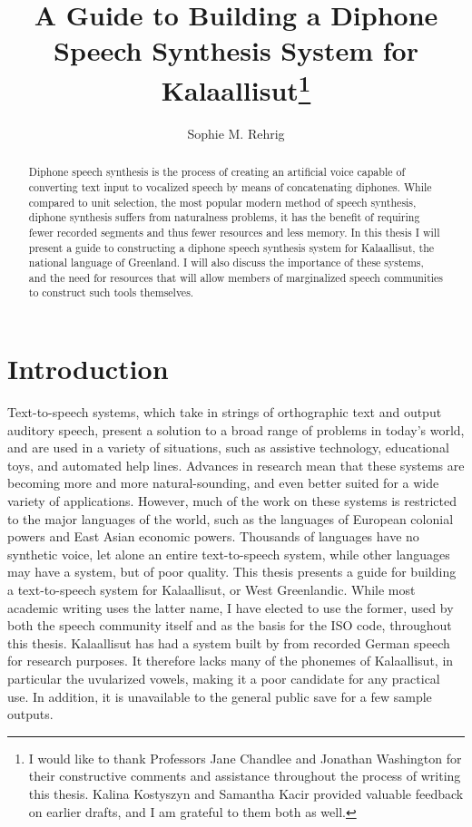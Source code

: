 \documentclass[12pt]{article}
\title{\vspace{-2cm}A Guide to Building a Diphone Speech Synthesis System for Kalaallisut\thanks{I would like to thank Professors Jane Chandlee and Jonathan Washington for their constructive comments and assistance throughout the process of writing this thesis. Kalina Kostyszyn and Samantha Kacir provided valuable feedback on earlier drafts, and I am grateful to them both as well.}}
\author{Sophie M. Rehrig}
\date{{\small\parbox{\linewidth}{\centering
A thesis submitted in partial fulfillment of the requirements for the degree of Bachelor of Arts in Linguistics\endgraf\bigskip
Bryn Mawr College \endgraf
December 2016}}}
\begin{document}
\maketitle
\thispagestyle{empty}

\begin{abstract}
Diphone speech synthesis is the process of creating an artificial voice capable of converting text input to vocalized speech by means of concatenating diphones. While compared to unit selection, the most popular modern method of speech synthesis, diphone synthesis suffers from naturalness problems, it has the benefit of requiring fewer recorded segments and thus fewer resources and less memory. In this thesis I will present a guide to constructing a diphone speech synthesis system for Kalaallisut, the national language of Greenland. I will also discuss the importance of these systems, and the need for resources that will allow members of marginalized speech communities to construct such tools themselves. \par
\end{abstract}

\clearpage
\newpage

\singlespacing
\tableofcontents
\doublespacing

\newpage

\section{Introduction}

Text-to-speech systems, which take in strings of orthographic text and output auditory speech, present a solution to a broad range of problems in today's world, and are used in a variety of situations, such as assistive technology, educational toys, and automated help lines. Advances in research mean that these systems are becoming more and more natural-sounding, and even better suited for a wide variety of applications. However, much of the work on these systems is restricted to the major languages of the world, such as the languages of European colonial powers and East Asian economic powers. Thousands of languages have no synthetic voice, let alone an entire text-to-speech system, while other languages may have a system, but of poor quality. This thesis presents a guide for building a text-to-speech system for Kalaallisut, or West Greenlandic. While most academic writing uses the latter name, I have elected to use the former, used by both the speech community itself and as the basis for the ISO code, throughout this thesis. Kalaallisut has had a system built by \citet{de_speech} from recorded German speech for research purposes. It therefore lacks many of the phonemes of Kalaallisut, in particular the uvularized vowels, making it a poor candidate for any practical use. In addition, it is unavailable to the general public save for a few sample outputs. \par
\end{document}
